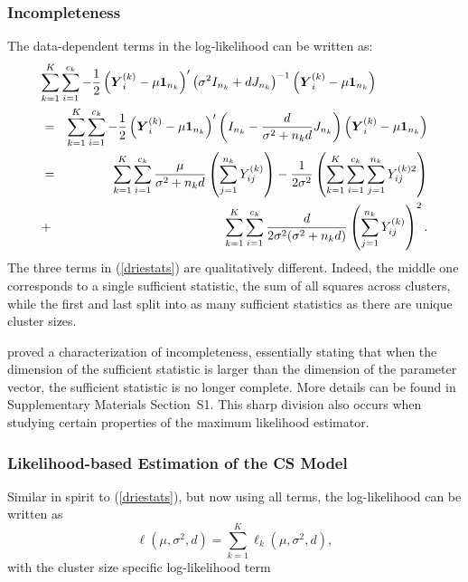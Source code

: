 \documentclass[11pt,a5paper,twoside]{book}
\newcommand{\BY}{\mbox{\boldmath $Y$}}
\begin{document}
\subsubsection{Incompleteness}

The data-dependent terms in the log-likelihood can  be written as:
\begin{equation}
\label{driestats}
\begin{aligned}
\lefteqn{\sum_{k=1}^K\sum_{i=1}^{c_k}-\frac{1}{2}\left(\BY_i^{(k)}-\mu\mathbf{1}_{n_k}\right)'\left(\sigma^2I_{n_k}+dJ_{n_k}\right)^{-1}\left(\BY_i^{(k)}-\mu\mathbf{1}_{n_k}\right)}\\
&=&\sum_{k=1}^K\sum_{i=1}^{c_k}-\frac{1}{2}\left(\BY_i^{(k)}-\mu\mathbf{1}_{n_k}\right)'\left(I_{n_k}-\frac{d}{\sigma^2+n_kd}J_{n_k}\right)\left(\BY_i^{(k)}-\mu\mathbf{1}_{n_k}\right)\\
&=&
\sum_{k=1}^K\sum_{i=1}^{c_k}\frac{\mu}{\sigma^2+n_kd}\left(\sum_{j=1}^{n_k}Y_{ij}^{(k)}\right)
-\frac{1}{2\sigma^2}
\left(\sum_{k=1}^K\sum_{i=1}^{c_k}\sum_{j=1}^{n_k}Y_{ij}^{(k)2}\right)  \\
&+&
\sum_{k=1}^K\sum_{i=1}^{c_k}\frac{d}{2\sigma^2(\sigma^2+n_kd)}\left(
\sum_{j=1}^{n_k}Y_{ij}^{(k)}
\right)^2.
\end{aligned}
\end{equation}
The three terms in (\ref{driestats}) are qualitatively different. Indeed, the middle one corresponds to a single sufficient statistic, the sum of all squares across clusters, while the first and last split into as many sufficient statistics as there are unique cluster sizes.

\cite{Lisa2015_2} proved a characterization of incompleteness, essentially stating that when the dimension of the sufficient statistic is larger than the dimension of the parameter vector, the sufficient statistic is no longer complete. More details can be found in Supplementary Materials Section~S1.
This sharp division also occurs when studying certain properties of the maximum likelihood estimator.

\subsubsection{Likelihood-based Estimation of the CS Model}
\label{likelihood}

Similar in spirit to (\ref{driestats}), but now using all terms, the log-likelihood can be written as
\begin{equation}
\label{loglikcs}
\ell(\mu,\sigma^2,d)=\sum_{k=1}^K\ell_k(\mu,\sigma^2,d),
\end{equation}
with the cluster size specific log-likelihood term
\end{document}
